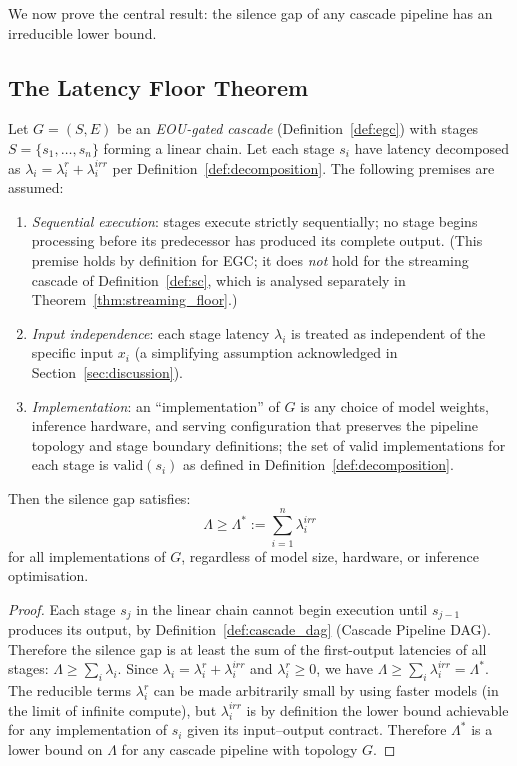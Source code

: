 We now prove the central result: the silence gap of any cascade pipeline has an
irreducible lower bound.

\subsection{The Latency Floor Theorem}

\begin{theorem}
\label{thm:latency_floor}
Let $G = (S, E)$ be an \emph{EOU-gated cascade} (Definition~\ref{def:egc}) with stages
$S = \{s_1, \ldots, s_n\}$ forming a linear chain.
Let each stage $s_i$ have latency decomposed as $\lambda_i = \lambda_i^r + \lambda_i^{irr}$
per Definition~\ref{def:decomposition}.
The following premises are assumed:
\begin{enumerate}
  \item \emph{Sequential execution}: stages execute strictly sequentially; no stage begins
        processing before its predecessor has produced its complete output.
        (This premise holds by definition for EGC; it does \emph{not} hold for the streaming
        cascade of Definition~\ref{def:sc}, which is analysed separately in
        Theorem~\ref{thm:streaming_floor}.)
  \item \emph{Input independence}: each stage latency $\lambda_i$ is treated as independent of the specific input $x_i$ (a simplifying assumption acknowledged in Section~\ref{sec:discussion}).
  \item \emph{Implementation}: an ``implementation'' of $G$ is any choice of model weights, inference hardware, and serving configuration that preserves the pipeline topology and stage boundary definitions; the set of valid implementations for each stage is $\mathrm{valid}(s_i)$ as defined in Definition~\ref{def:decomposition}.
\end{enumerate}
Then the silence gap satisfies:
\begin{equation}
  \Lambda \geq \Lambda^* := \sum_{i=1}^{n} \lambda_i^{irr}
\end{equation}
for all implementations of $G$, regardless of model size, hardware, or inference optimisation.
\end{theorem}

\begin{proof}
Each stage $s_j$ in the linear chain cannot begin execution until $s_{j-1}$ produces its output,
by Definition~\ref{def:cascade_dag} (Cascade Pipeline DAG).
Therefore the silence gap is at least the sum of the first-output latencies of all stages:
$\Lambda \geq \sum_i \lambda_i$.
Since $\lambda_i = \lambda_i^r + \lambda_i^{irr}$ and $\lambda_i^r \geq 0$,
we have $\Lambda \geq \sum_i \lambda_i^{irr} = \Lambda^*$.
The reducible terms $\lambda_i^r$ can be made arbitrarily small by using faster models
(in the limit of infinite compute), but $\lambda_i^{irr}$ is by definition the lower bound
achievable for any implementation of $s_i$ given its input--output contract.
Therefore $\Lambda^*$ is a lower bound on $\Lambda$ for any cascade pipeline with topology $G$.
\end{proof}

